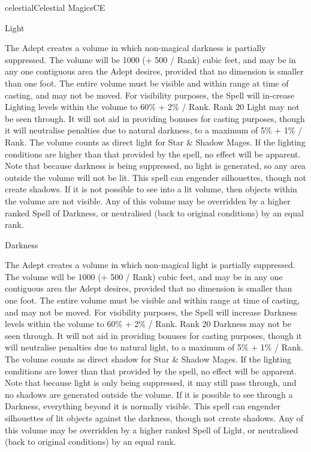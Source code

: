 \begin{College}[1.3]{celestial}{Celestial Magics}{CE}
\begin{spell}[G-2]{Light}
\begin{effects}
The Adept creates a volume in which non-magical darkness is partially
suppressed.  The volume will be 1000 (+ 500 / Rank) cubic feet, and
may be in any one contiguous area the Adept desires, provided that no
dimension is smaller than one foot.  The entire volume must be visible
and within range at time of casting, and may not be moved.  For
visibility purposes, the Spell will in-crease Lighting levels within
the volume to 60\% + 2\% / Rank.  Rank 20 Light may not be seen
through.  It will not aid in providing bonuses for casting purposes,
though it will neutralise penalties due to natural darkness, to a
maximum of 5\% + 1\% / Rank.  The volume counts as direct light for
Star \& Shadow Mages.  If the lighting conditions are higher than that
provided by the spell, no effect will be apparent.  Note that because
darkness is being suppressed, no light is generated, so any area
outside the volume will not be lit.  This spell can engender
silhouettes, though not create shadows. If it is not possible to see
into a lit volume, then objects within the volume are not visible.
Any of this volume may be overridden by a higher ranked Spell of
Darkness, or neutralised (back to original conditions) by an equal
rank.
\end{effects}
\end{spell}

\begin{spell}[G-3]{Darkness}

\begin{effects}
The Adept creates a volume in which non-magical light is partially
suppressed.  The volume will be 1000 (+ 500 / Rank) cubic feet, and
may be in any one contiguous area the Adept desires, provided that no
dimension is smaller than one foot.  The entire volume must be visible
and within range at time of casting, and may not be moved.  For
visibility purposes, the Spell will increase Darkness levels within
the volume to 60\% + 2\% / Rank.  Rank 20 Darkness may not be seen
through. It will not aid in providing bonuses for casting purposes,
though it will neutralise penalties due to natural light, to a maximum
of 5\% + 1\% / Rank.  The volume counts as direct shadow for Star \&
Shadow Mages.  If the lighting conditions are lower than that provided
by the spell, no effect will be apparent.  Note that because light is
only being suppressed, it may still pass through, and no shadows are
generated outside the volume. If it is possible to see through a
Darkness, everything beyond it is normally visible.  This spell can
engender silhouettes of lit objects against the darkness, though not
create shadows.  Any of this volume may be overridden by a higher
ranked Spell of Light, or neutralised (back to original conditions) by
an equal rank.
\end{effects}
\end{spell}


\end{College}
